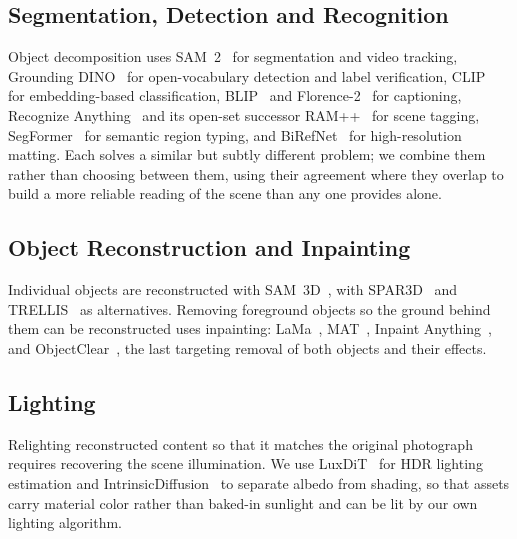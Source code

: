 \subsection{Segmentation, Detection and Recognition}

Object decomposition uses SAM~2~\cite{ravi2024sam2segmentimages} for segmentation
and video tracking, Grounding DINO~\cite{liu2024groundingdino} for
open-vocabulary detection and label verification,
CLIP~\cite{radford2021learningtransferablevisual} for embedding-based
classification,
BLIP~\cite{li2022blipbootstrappinglanguageimagepretraining} and
Florence-2~\cite{xiao2024florence2} for captioning,
Recognize Anything~\cite{zhang2023recognize,huang2023tag2text} and its open-set
successor RAM++~\cite{huang2023open} for scene tagging,
SegFormer~\cite{DBLP:journals/corr/abs-2105-15203} for semantic region typing, and
BiRefNet~\cite{zheng2024birefnet} for high-resolution matting. Each solves a
similar but subtly different problem; we combine them rather than choosing between
them, using their agreement where they overlap to build a more reliable reading of
the scene than any one provides alone.

\subsection{Object Reconstruction and Inpainting}

Individual objects are reconstructed with
SAM~3D~\cite{sam3dteam2025sam3d3dfyimages}, with
SPAR3D~\cite{huang2025spar3dstablepointawarereconstruction} and
TRELLIS~\cite{xiang2025trellis2} as alternatives.
Removing foreground objects so the ground behind them can be reconstructed uses
inpainting: LaMa~\cite{suvorov2021resolution},
MAT~\cite{li2022mat}, Inpaint Anything~\cite{yu2023inpaint}, and
ObjectClear~\cite{zhao2026objectclear}, the last targeting removal of both objects
and their effects.

\subsection{Lighting}

Relighting reconstructed content so that it matches the original photograph
requires recovering the scene illumination. We use
LuxDiT~\cite{liang2025luxdit} for HDR lighting estimation
and IntrinsicDiffusion~\cite{Luo2024IntrinsicDiffusion} to separate albedo from
shading, so that assets carry material color rather than baked-in sunlight and
can be lit by our own lighting algorithm.
